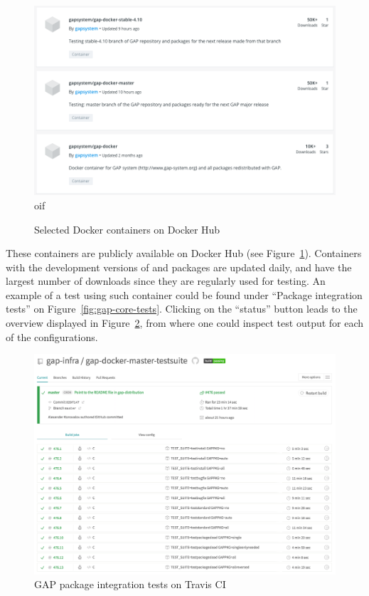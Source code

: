 \begin{figure}[!ht]
    \centering
    \includegraphics[width=12cm]{images/gap-docker}oif
    \caption{Selected \GAP Docker containers on Docker Hub}
    \label{fig:gap-docker}
\end{figure}

These containers are publicly available on Docker Hub (see Figure~\ref{fig:gap-docker}).
Containers with the development versions of \GAP and packages are updated daily, and have
the largest number of downloads since they are regularly used for testing. An example of
a test using such container could be found under ``Package integration tests'' on
Figure~\ref{fig:gap-core-tests}. Clicking on the ``status'' button leads to the overview displayed
in Figure~\ref{fig:gap-docker-master-testsuite}, from where one could inspect
test output for each of the configurations. 

\begin{figure}[!ht]
    \centering
    \includegraphics[width=\textwidth]{images/gap-docker-master-testsuite}
    \caption{GAP package integration tests on Travis CI}
    \label{fig:gap-docker-master-testsuite}
\end{figure}

